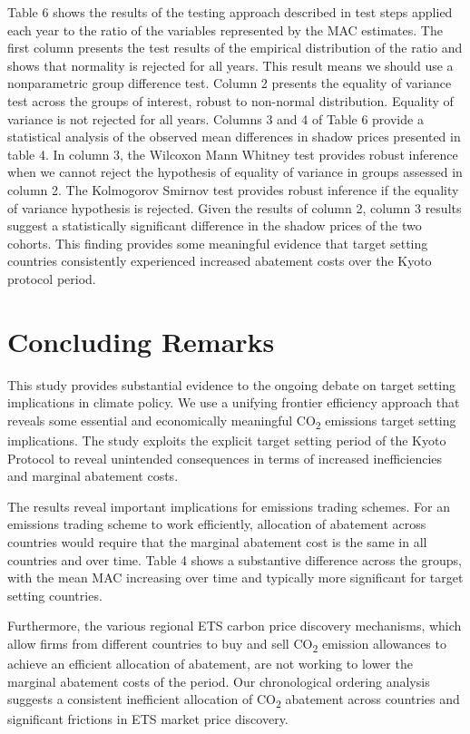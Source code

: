 \documentclass[
  10pt,
]{article}
\begin{document}
Table 6 shows the results of the testing approach described in test
steps applied each year to the ratio of the variables represented by the
MAC estimates. The first column presents the test results of the
empirical distribution of the ratio and shows that normality is rejected
for all years. This result means we should use a nonparametric group
difference test. Column 2 presents the equality of variance test across
the groups of interest, robust to non-normal distribution. Equality of
variance is not rejected for all years. Columns 3 and 4 of Table 6
provide a statistical analysis of the observed mean differences in
shadow prices presented in table 4. In column 3, the Wilcoxon Mann
Whitney test provides robust inference when we cannot reject the
hypothesis of equality of variance in groups assessed in column 2. The
Kolmogorov Smirnov test provides robust inference if the equality of
variance hypothesis is rejected. Given the results of column 2, column 3
results suggest a statistically significant difference in the shadow
prices of the two cohorts. This finding provides some meaningful
evidence that target setting countries consistently experienced
increased abatement costs over the Kyoto protocol period. \newpage

\hypertarget{concluding-remarks}{%
\section{Concluding Remarks}\label{concluding-remarks}}

This study provides substantial evidence to the ongoing debate on target
setting implications in climate policy. We use a unifying frontier
efficiency approach that reveals some essential and economically
meaningful CO\textsubscript{2} emissions target setting implications.
The study exploits the explicit target setting period of the Kyoto
Protocol to reveal unintended consequences in terms of increased
inefficiencies and marginal abatement costs.

The results reveal important implications for emissions trading schemes.
For an emissions trading scheme to work efficiently, allocation of
abatement across countries would require that the marginal abatement
cost is the same in all countries and over time. Table 4 shows a
substantive difference across the groups, with the mean MAC increasing
over time and typically more significant for target setting countries.

Furthermore, the various regional ETS carbon price discovery mechanisms,
which allow firms from different countries to buy and sell
CO\textsubscript{2} emission allowances to achieve an efficient
allocation of abatement, are not working to lower the marginal abatement
costs of the period. Our chronological ordering analysis suggests a
consistent inefficient allocation of CO\textsubscript{2} abatement
across countries and significant frictions in ETS market price
discovery.
\end{document}
